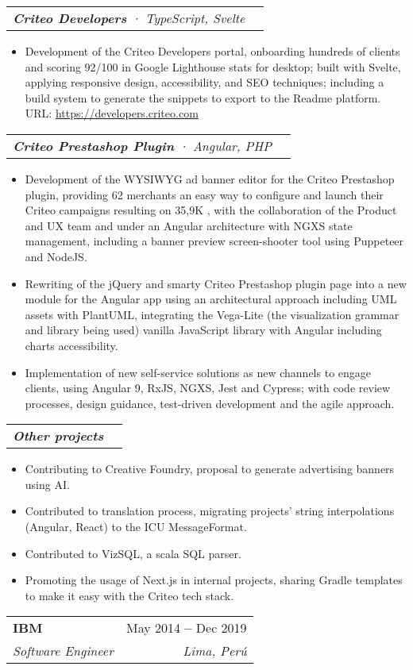 \documentclass[letterpaper,11pt]{article}
\makeatletter
\newcommand{\resumeItem}[1]{
  \item\small{
    {#1 \vspace{-2pt}}
  }
}
\newcommand{\resumeSubheading}[4]{
  \vspace{-4pt}\item
    \begin{tabular*}{0.97\textwidth}[t]{l@{\extracolsep{\fill}}r}
      \textbf{#1} & \small#2 \\
      \textit{\small#3} & \textit{\small #4} \\
    \end{tabular*}\vspace{-7pt}
}
\newcommand{\resumeSubSubheading}[2]{
    \vspace{-2pt}\item
    \begin{tabular*}{0.97\textwidth}{l@{\extracolsep{\fill}}r}
      \textit{\small#1} & \textit{\small #2} \\
    \end{tabular*}\vspace{-7pt}
}
\newcommand{\resumeItemListStart}{\begin{itemize}}
\newcommand{\resumeItemListEnd}{\end{itemize}\vspace{-5pt}}
\makeatother
\begin{document}
      \resumeSubSubheading{\textbf{Criteo Developers} · TypeScript, Svelte }{}
      \resumeItemListStart
        \resumeItem{Development of the Criteo Developers portal, onboarding hundreds of clients and scoring 92/100 in Google Lighthouse stats for desktop; built with Svelte, applying responsive design, accessibility, and SEO techniques; including a build system to generate the snippets to export to the Readme platform.
        \\[1.5pt]
        URL: {\href{https://developers.criteo.com}{\color{blue}https://developers.criteo.com}}
        }
      \resumeItemListEnd

      \resumeSubSubheading{\textbf{Criteo Prestashop Plugin} · Angular, PHP}{}
      \resumeItemListStart
        \resumeItem{Development of the WYSIWYG ad banner editor for the Criteo Prestashop plugin, providing 62 merchants an easy way to configure and launch their Criteo campaigns resulting on 35,9K , with the collaboration of the Product and UX team and under an Angular architecture with NGXS state management, including a banner preview screen-shooter tool using Puppeteer and NodeJS.}
        \resumeItem{Rewriting of the jQuery and smarty Criteo Prestashop plugin page into a new module for the Angular app using an architectural approach including UML assets with PlantUML, integrating the Vega-Lite (the visualization grammar and library being used) vanilla JavaScript library with Angular including charts accessibility.}
        \resumeItem{Implementation of new self-service solutions as new channels to engage clients, using Angular 9, RxJS, NGXS, Jest and Cypress; with code review processes, design guidance, test-driven development and the agile approach.}
      \resumeItemListEnd

      \resumeSubSubheading{\textbf{Other projects} }{}
        \resumeItemListStart
          \resumeItem{Contributing to Creative Foundry, proposal to generate advertising banners using AI.}
          \resumeItem{Contributed to translation process, migrating projects' string interpolations (Angular, React) to the ICU MessageFormat.}
          \resumeItem{Contributed to VizSQL, a scala SQL parser.}
          \resumeItem{Promoting the usage of Next.js in internal projects, sharing Gradle templates to make it easy with the Criteo tech stack.}
        \resumeItemListEnd

    \resumeSubheading
    {IBM}{May 2014 \textbf{--} Dec 2019}
    {Software Engineer}{Lima, Perú}
    \vspace{8pt}
\end{document}
